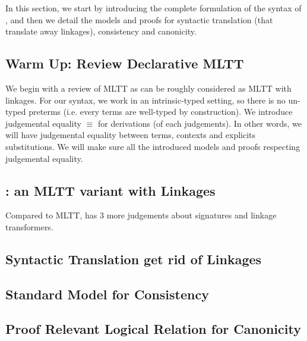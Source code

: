 In this section, we start by introducing the complete formulation of the syntax of \TT, 
and then we detail the models and proofs for syntactic translation (that translate away linkages), 
consistency and canonicity. 

\subsection{Warm Up: Review Declarative MLTT}
We begin with a review of MLTT as \TT can be roughly considered as MLTT with linkages.
For our syntax, we work in an intrinsic-typed setting, so there is no un-typed preterms 
(i.e. every terms are well-typed by construction). We introduce judgemental equality $\equiv$
for derivations (of each judgements). In other words, we will have judgemental equality between terms, 
contexts and explicits substitutions. 
We will make sure all the introduced models and proofs respecting judgemental equality.



\subsection{\TT : an MLTT variant with Linkages}
Compared to MLTT, \TT has 3 more judgements about signatures and linkage transformers.








\subsection{Syntactic Translation get rid of Linkages}



\subsection{Standard Model for Consistency}




\subsection{Proof Relevant Logical Relation for Canonicity}

